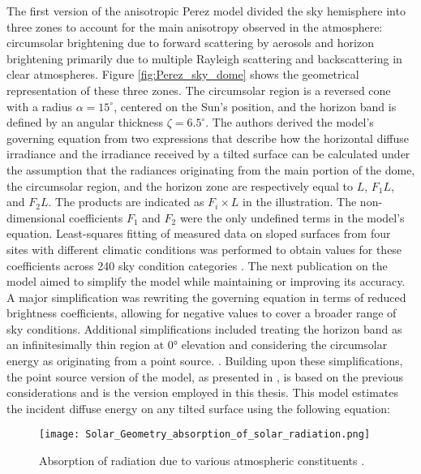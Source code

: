 The first version of the anisotropic Perez model \cite{Perez1986} divided the sky hemisphere
into three zones to account for the main anisotropy observed in the atmosphere: circumsolar
brightening due to forward scattering by aerosols and horizon brightening primarily due to
multiple Rayleigh scattering and backscattering in clear atmospheres. Figure \ref{fig:Perez_sky_dome}
shows the geometrical representation of these three zones. The circumsolar region is a
reversed cone with a radius \(\alpha = 15^\circ\), centered on the Sun's position, and the
horizon band is defined by an angular thickness \(\zeta = 6.5^\circ\).
The authors derived the model's governing equation from two expressions that describe how
the horizontal diffuse irradiance and the irradiance received by a tilted surface can be
calculated under the assumption that the radiances originating from the main portion of
the dome, the circumsolar region, and the horizon zone are respectively equal to \(L\), \(F_{1} L\),
and \(F_{2} L\). The products are indicated as \(F_{i} \times L\) in the illustration. The
non-dimensional coefficients \(F_{1}\) and \(F_{2}\) were the only undefined terms in
the model's equation. Least-squares fitting of measured data on sloped surfaces from
four sites with different climatic conditions was performed to obtain values for these
coefficients across 240 sky condition categories \cite[p. 481ff]{Perez1986}.
The next publication on the model \cite{Perez1987} aimed to simplify the model while maintaining or improving
its accuracy. A major simplification was rewriting the governing equation in terms of reduced
brightness coefficients, allowing for negative values to cover a broader range of sky conditions.
Additional simplifications included treating the horizon band as an infinitesimally thin region
at 0° elevation and considering the circumsolar energy as originating from a point source.
\cite[p. 222ff]{Perez1987}. Building upon these simplifications, the point source version of the model, as presented
in \cite{Perez1990}, is based on the previous considerations and is the version employed in this thesis.
This model estimates the incident diffuse energy on any tilted surface using the following equation:

\begin{figure}
    \centering
    \texttt{[image: Solar\_Geometry\_absorption\_of\_solar\_radiation.png]}
    \caption{\small Absorption of radiation due to various atmospheric constituents \cite{CIBSE}.}
    \label{fig:Absorption_of_solar_radiation}
\end{figure}

